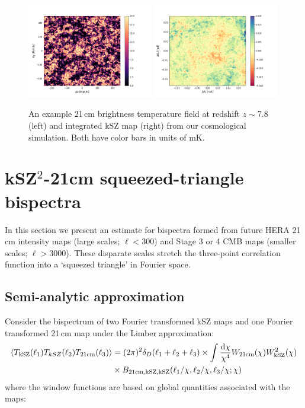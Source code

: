 \begin{figure}
\centering
\includegraphics[width=0.49\textwidth]{chapters/ksz_21cm/figures/21cmExample_z7p8.png}
\includegraphics[width=0.49\textwidth]{chapters/ksz_21cm/figures/kszmap.png}
\caption[An example 21\,cm brightness temperature field and integrated kSZ map from our cosmological simulation.]{An example 21\,cm brightness temperature field at redshift $z\sim$7.8 (left) and integrated kSZ map (right) from our cosmological simulation. Both have color bars in units of mK.}
\label{fig:ksz_21cm_sim_example}
\end{figure}

\section{kSZ$^2$-21cm squeezed-triangle bispectra}
\label{sec:bispec}

In this section we present an estimate for bispectra formed from future HERA 21\,cm intensity maps (large scales; $\ell < 300$) and Stage 3 or 4 CMB maps (smaller scales; $\ell > 3000$). These disparate scales stretch the three-point correlation function into a `squeezed triangle' in Fourier space.

\subsection{Semi-analytic approximation}
\label{subsec:ksz_21cm_semi_analytic_approximation}

Consider the bispectrum of two Fourier transformed kSZ maps and one Fourier transformed 21\,cm map under the Limber approximation:
\begin{equation}
\begin{split}
 \left\langle T_{\rm kSZ}(\ell_1) T_{kSZ}(\ell_2) T_{\rm 21cm}(\ell_3)\right\rangle &= 
(2\pi)^2 \delta_D(\ell_1 + \ell_2 + \ell_3) \times \int
 \frac{{\rm d}\chi}{\chi^4} W_{\rm 21cm}(\chi) W_{\rm kSZ}^2(\chi)  \\
 & \times B_{\rm 21cm, kSZ, kSZ}(\ell_1/\chi, \ell_2/\chi,  \ell_3/\chi; \chi)
\label{eq:bispec_limber}
\end{split}
\end{equation}
where the window functions are based on global quantities associated with the maps:

